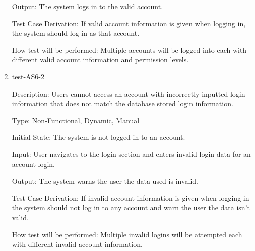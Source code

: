 \documentclass[12pt, titlepage]{article}
\begin{document}
\begin{enumerate}
  Output: The system logs in to the valid account.

  Test Case Derivation: If valid account information is given when logging in,
  the system should log in as that account.

  How test will be performed: Multiple accounts will be logged into each with
  different valid account information and permission levels.

  \item{test-AS6-2\\}
  
  Description: Users cannot access an account with incorrectly
  inputted login information that does not match the database
  stored login information.

  Type: Non-Functional, Dynamic, Manual

  Initial State: The system is not logged in to an account.

  Input: User navigates to the login section and enters invalid login data
  for an account login.

  Output: The system warns the user the data used is invalid.

  Test Case Derivation: If invalid account information is given when logging
  in the system should not log in to any account and warn the user the data
  isn't valid.

  How test will be performed: Multiple invalid logins will be attempted each
  with different invalid account information.

  
            
            
            
            




\end{enumerate}
\end{document}
